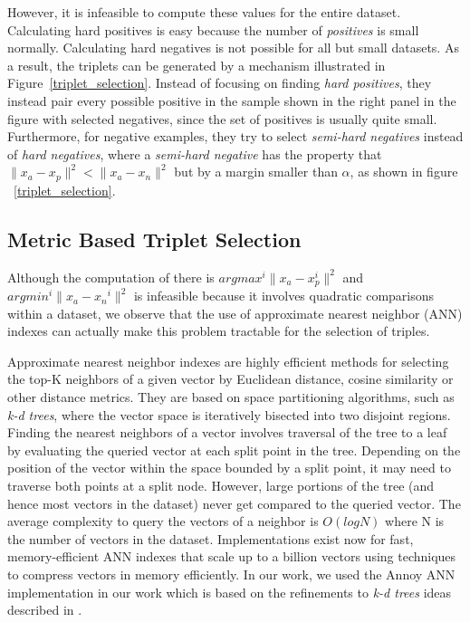 However, it is infeasible to compute these values for the entire dataset.  Calculating hard positives is easy because the number of \textit{positives} is small normally.  Calculating hard negatives is not possible for all but small datasets.  As a result, the triplets can be generated by a mechanism illustrated in Figure~\ref{triplet_selection}.  Instead of focusing on finding \textit{hard positives}, they instead pair every possible positive in the sample shown in the right panel in the figure with selected negatives, since the set of positives is usually quite small.  Furthermore, for negative examples, they try to select \textit{semi-hard negatives} instead of \textit{hard negatives}, where a \textit{semi-hard negative} has the property that $\|x_a - x_p \|^2 < \|x_a - x_n \|^2$ but by a margin smaller than $\alpha$, as shown in figure ~\ref{triplet_selection}.  


\subsection{Metric Based Triplet Selection}
Although the computation of there is $argmax^i \| x_{a} - x_{p}^i \|^2$ and $argmin^i \| x_{a} - x{_n}^i \|^2$ is infeasible because it involves quadratic comparisons within a dataset, we observe that the use of approximate nearest neighbor (ANN) indexes can actually make this problem tractable for the selection of triples.  

Approximate nearest neighbor indexes are highly efficient methods for selecting the top-K neighbors of a given vector by Euclidean distance, cosine similarity or other distance metrics.  They are based on space partitioning algorithms, such as \textit{k-d trees}, where the vector space is iteratively bisected into two disjoint regions.  Finding the nearest neighbors of a vector involves traversal of the tree to a leaf by evaluating the queried vector at each split point in the tree.  Depending on the position of the vector within the space bounded by a split point, it may need to traverse both points at a split node.  However, large portions of the tree (and hence most vectors in the dataset) never get compared to the queried vector.  The average complexity to query the vectors of a neighbor is $O(log N)$ where N is the number of vectors in the dataset.  Implementations exist now for fast, memory-efficient ANN indexes that scale up to a billion vectors \cite{JDH17} using techniques to compress vectors in memory efficiently.  In our work, we used the Annoy ANN implementation \cite{annoy_git} in our work which is based on the refinements to \textit{k-d trees} ideas described in \cite{ann_paper}.

